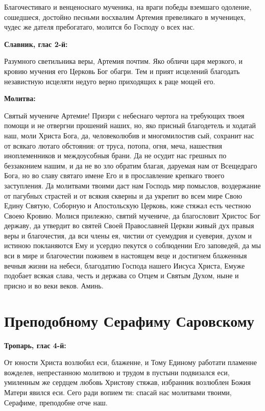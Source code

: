Благочестиваго и венценоснаго мученика, на враги победы вземшаго одоление, сошедшеся, достойно песньми восхвалим Артемия превеликаго в мученицех, чудес же дателя пребогатаго, молится бо Господу о всех нас.


\medskip


\bfseries Славник, глас 2-й:\normalfont{}\nopagebreak


Разумного светильника веры, Артемия почтим. Яко обличи царя мерзкого, и кровию мучения его Церковь Бог обагри. Тем и прият исцелений благодать независтную исцеляти недуго верно приходящих к раце мощей его.


\medskip


\bfseries Молитва:\normalfont{}\nopagebreak


Святый мучениче Артемие! Призри с небеснаго чертога на требующих твоея помощи и не отвергни прошений наших, но, яко присный благодетель и ходатай наш, моли Христа Бога, да, человеколюбив и многомилостив сый, сохранит нас от всякаго лютаго обстояния: от труса, потопа, огня, меча, нашествия иноплеменников и междоусобныя брани. Да не осудит нас грешных по беззаконием нашим, и да не во зло обратим благая, даруемая нам от Всещедраго Бога, но во славу святаго имене Его и в прославление крепкаго твоего заступления. Да молитвами твоими даст нам Господь мир помыслов, воздержание от пагубных страстей и от всякия скверны и да укрепит во всем мире Свою Едину Святую, Соборную и Апостольскую Церковь, юже стяжал есть честною Своею Кровию. Молися прилежно, святий мучениче, да благословит Христос Бог державу, да утвердит во святей Своей Православней Церкви живый дух правыя веры и благочестия, да вси члены ея, чистии от суемудрия и суеверия, духом и истиною покланяются Ему и усердно пекутся о соблюдении Его заповедей, да мы вси в мире и благочестии поживем в настоящем веце и достигнем блаженныя вечныя жизни на небеси, благодатию Господа нашего Иисуса Христа, Емуже подобает всякая слава, честь и держава со Отцем и Святым Духом, ныне и присно и во веки веков. Аминь.


\section{Преподобному Серафиму Саровскому}
 


\bfseries Тропарь, глас 4-й:\normalfont{}\nopagebreak


От юности Христа возлюбил еси, блаженне, и Тому Единому работати пламенне вожделев, непрестанною молитвою и трудом в пустыни подвизался еси, умиленным же сердцем любовь Христову стяжав, избранник возлюблен Божия Матери явился еси. Сего ради вопием ти: спасай нас молитвами твоими, Серафиме, преподобне отче наш.


